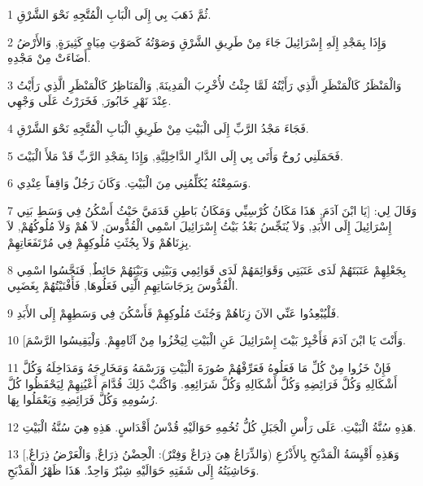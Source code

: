 \par 1 ثُمَّ ذَهَبَ بِي إِلَى الْبَابِ الْمُتَّجِهِ نَحْوَ الشَّرْقِ.
\par 2 وَإِذَا بِمَجْدِ إِلَهِ إِسْرَائِيلَ جَاءَ مِنْ طَرِيقِ الشَّرْقِ وَصَوْتُهُ كَصَوْتِ مِيَاهٍ كَثِيرَةٍ, وَالأَرْضُ أَضَاءَتْ مِنْ مَجْدِهِ.
\par 3 وَالْمَنْظَرُ كَالْمَنْظَرِ الَّذِي رَأَيْتُهُ لَمَّا جِئْتُ لأُخْرِبَ الْمَدِينَةَ, وَالْمَنَاظِرُ كَالْمَنْظَرِ الَّذِي رَأَيْتُ عِنْدَ نَهْرِ خَابُورَ, فَخَرَرْتُ عَلَى وَجْهِي.
\par 4 فَجَاءَ مَجْدُ الرَّبِّ إِلَى الْبَيْتِ مِنْ طَرِيقِ الْبَابِ الْمُتَّجِهِ نَحْوَ الشَّرْقِ.
\par 5 فَحَمَلَنِي رُوحٌ وَأَتَى بِي إِلَى الدَّارِ الدَّاخِلِيَّةِ, وَإِذَا بِمَجْدِ الرَّبِّ قَدْ مَلأَ الْبَيْتَ.
\par 6 وَسَمِعْتُهُ يُكَلِّمُنِي مِنَ الْبَيْتِ. وَكَانَ رَجُلٌ وَاقِفاً عِنْدِي.
\par 7 وَقَالَ لِي: [يَا ابْنَ آدَمَ, هَذَا مَكَانُ كُرْسِيِّي وَمَكَانُ بَاطِنِ قَدَمَيَّ حَيْثُ أَسْكُنُ فِي وَسَطِ بَنِي إِسْرَائِيلَ إِلَى الأَبَدِ, وَلاَ يُنَجِّسُ بَعْدُ بَيْتُ إِسْرَائِيلَ اسْمِي الْقُدُّوسَ, لاَ هُمْ وَلاَ مُلُوكُهُمْ, لاَ بِزِنَاهُمْ وَلاَ بِجُثَثِ مُلُوكِهِمْ فِي مُرْتَفَعَاتِهِمْ.
\par 8 بِجَعْلِهِمْ عَتَبَتَهُمْ لَدَى عَتَبَتِي وَقَوَائِمَهُمْ لَدَى قَوَائِمِي وَبَيْنِي وَبَيْنَهُمْ حَائِطٌ, فَنَجَّسُوا اسْمِي الْقُدُّوسَ بِرَجَاسَاتِهِمِ الَّتِي فَعَلُوهَا, فَأَفْنَيْتُهُمْ بِغَضَبِي.
\par 9 فَلْيُبْعِدُوا عَنِّي الآنَ زِنَاهُمْ وَجُثَثَ مُلُوكِهِمْ فَأَسْكُنَ فِي وَسَطِهِمْ إِلَى الأَبَدِ.
\par 10 [وَأَنْتَ يَا ابْنَ آدَمَ فَأَخْبِرْ بَيْتَ إِسْرَائِيلَ عَنِ الْبَيْتِ لِيَخْزُوا مِنْ آثَامِهِمْ. وَلْيَقِيسُوا الرَّسْمَ.
\par 11 فَإِنْ خَزُوا مِنْ كُلِّ مَا فَعَلُوهُ فَعَرِّفْهُمْ صُورَةَ الْبَيْتِ وَرَسْمَهُ وَمَخَارِجَهُ وَمَدَاخِلَهُ وَكُلَّ أَشْكَالِهِ وَكُلَّ فَرَائِضِهِ وَكُلَّ أَشْكَالِهِ وَكُلَّ شَرَائِعِهِ. وَاكْتُبْ ذَلِكَ قُدَّامَ أَعْيُنِهِمْ لِيَحْفَظُوا كُلَّ رُسُومِهِ وَكُلَّ فَرَائِضِهِ وَيَعْمَلُوا بِهَا.
\par 12 هَذِهِ سُنَّةُ الْبَيْتِ. عَلَى رَأْسِ الْجَبَلِ كُلُّ تُخُمِهِ حَوَالَيْهِ قُدْسُ أَقْدَاسٍ. هَذِهِ هِيَ سُنَّةُ الْبَيْتِ.
\par 13 [وَهَذِهِ أَقْيِسَةُ الْمَذْبَحِ بِالأَذْرُعِ (وَالذِّرَاعُ هِيَ ذِرَاعٌ وَفِتْرٌ): الْحِضْنُ ذِرَاعٌ, وَالْعَرْضُ ذِرَاعٌ, وَحَاشِيَتُهُ إِلَى شَفَتِهِ حَوَالَيْهِ شِبْرٌ وَاحِدٌ. هَذَا ظَهْرُ الْمَذْبَحِ.
